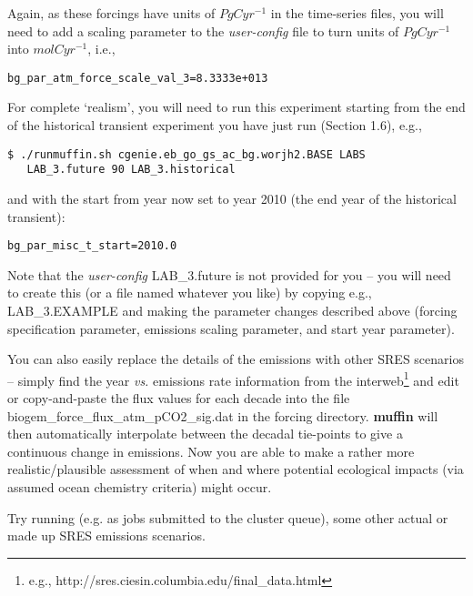 \documentclass[11pt,fleqn]{book} %
\begin{document}
Again, as these forcings have units of \(PgCyr^{-1}\) in the time-series files, you will need to add a scaling parameter to the \textit{user-config} file to turn units of \(PgCyr^{-1}\) into \(mol C yr^{-1}\), i.e.,
\vspace{-2pt}\begin{verbatim}
bg_par_atm_force_scale_val_3=8.3333e+013
\end{verbatim}\vspace{-2pt}

For complete ‘realism’, you will need to run this experiment starting from the end of the historical transient experiment you have just run (Section 1.6), e.g.,
\vspace{-2pt}\begin{verbatim}
$ ./runmuffin.sh cgenie.eb_go_gs_ac_bg.worjh2.BASE LABS
   LAB_3.future 90 LAB_3.historical
\end{verbatim}\vspace{-2pt}
and with the start from year now set to year 2010 (the end year of the historical transient):
\vspace{-2pt}\begin{verbatim}
bg_par_misc_t_start=2010.0
\end{verbatim}\vspace{-2pt}
Note that the \textit{user-config} \footnotesize\textsf{LAB\_3.future }\normalsize is not provided for you – you will need to create this (or a file named whatever you like) by copying e.g., \footnotesize\textsf{LAB\_3.EXAMPLE }\normalsize and making the parameter changes described above (forcing specification parameter, emissions scaling parameter, and start year parameter).

You can also easily replace the details of the emissions with other SRES scenarios – simply find the year \textit{vs.} emissions rate information from the interweb\footnote{e.g., http://sres.ciesin.columbia.edu/final\_data.html} and edit or copy-and-paste the flux values for each decade into the file \footnotesize\textsf{biogem\_force\_flux\_atm\_pCO2\_sig.dat }\normalsize in the forcing directory.\textbf{ muffin} will then automatically interpolate between the decadal tie-points to give a continuous change in emissions. Now you are able to make a rather more realistic/plausible assessment of when and where potential ecological impacts (via assumed ocean chemistry criteria) might occur.

Try running (e.g. as jobs submitted to the cluster queue), some other actual or made up SRES emissions scenarios.
\end{document}
